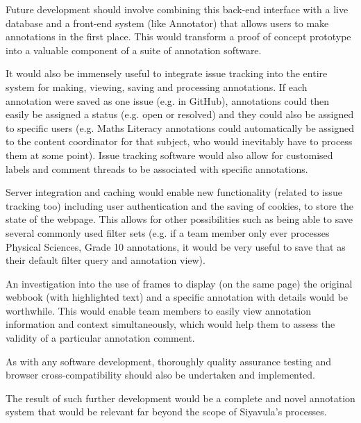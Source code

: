 Future development should involve combining this back-end interface with a live database and a front-end system (like Annotator) that allows users to make annotations in the first place. This would transform a proof of concept prototype into a valuable component of a suite of annotation software.

It would also be immensely useful to integrate issue tracking into the entire system for making, viewing, saving and processing annotations. If each annotation were saved as one issue (e.g. in GitHub), annotations could then easily be assigned a status (e.g. open or resolved) and they could also be assigned to specific users (e.g. Maths Literacy annotations could automatically be assigned to the content coordinator for that subject, who would inevitably have to process them at some point). Issue tracking software would also allow for customised labels and comment threads to be associated with specific annotations. 

Server integration and caching would enable new functionality (related to issue tracking too) including user authentication and the saving of cookies, to store the state of the webpage. This allows for other possibilities such as being able to save several commonly used filter sets (e.g. if a team member only ever processes Physical Sciences, Grade 10 annotations, it would be very useful to save that as their default filter query and annotation view). 

An investigation into the use of frames to display (on the same page) the original webbook (with highlighted text) and a specific annotation with details would be worthwhile. This would enable team members to easily view annotation information and context simultaneously, which would help them to assess the validity of a particular annotation comment.

As with any software development, thoroughly quality assurance testing and browser cross-compatibility should also be undertaken and implemented. 

The result of such further development would be a complete and novel annotation system that would be relevant far beyond the scope of Siyavula's processes. 
